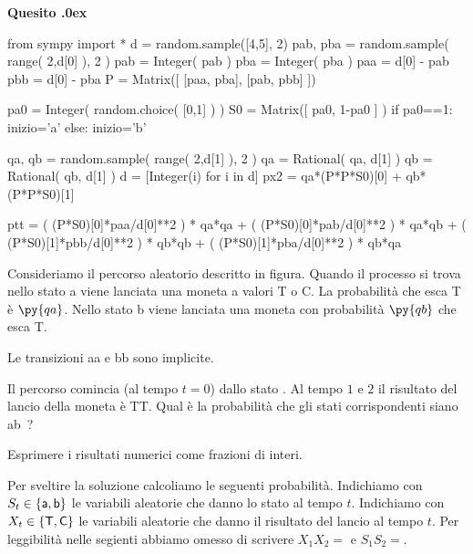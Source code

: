 \documentclass[11pt,twoside,a4paper]{article}
\newcounter{quesito}
\newenvironment{question}{\bigskip\addtocounter{quesito}{1}\bigskip\bigskip\par\textbf{Quesito \thequesito.\kern0ex}}{\par\vspace{\parskip}}
\begin{document}
\clearpage
\begin{question}%
\def\Pr{{\rm Pr\,}}
\def\nicefrac#1#2{#1/#2}
\def\pyl#1{\py{latex(#1)}}
\everymath{\displaystyle}
\renewcommand{\arraystretch}{1.5}
\begin{pycode}
from sympy import *
d =  random.sample([4,5], 2) 
pab, pba = random.sample( range( 2,d[0] ), 2 )
pab = Integer( pab )
pba = Integer( pba )
paa = d[0] - pab
pbb = d[0] - pba
P  = Matrix([ [paa, pba], 
              [pab, pbb] ])

pa0 = Integer( random.choice( [0,1] ) ) 
S0  = Matrix([ pa0, 1-pa0 ] ) 
if pa0==1: inizio='a' 
else: inizio='b' 

qa, qb = random.sample( range( 2,d[1] ), 2 ) 
qa = Rational( qa, d[1] ) 
qb = Rational( qb, d[1] ) 
d = [Integer(i) for i in d]
px2 = qa*(P*P*S0)[0] + qb*(P*P*S0)[1]

ptt = ( (P*S0)[0]*paa/d[0]**2 ) * qa*qa
+ ( (P*S0)[0]*pab/d[0]**2 ) * qa*qb
+ ( (P*S0)[1]*pbb/d[0]**2 ) * qb*qb
+ ( (P*S0)[1]*pba/d[0]**2 ) * qb*qa
\end{pycode}
Consideriamo il percorso aleatorio descritto in figura. Quando il processo si trova nello stato {\sf a} viene lanciata una moneta a valori {\sf T} o {\sf C}. La probabilità che esca {\sf T} è $\py{qa}$. Nello stato {\sf b} viene lanciata una moneta con probabilità $\py{qb}$ che esca {\sf T}.

\hfil
{}
\hfil Le transizioni {\sf aa} e {\sf bb} sono implicite.

Il percorso comincia (al tempo $t{=}0$) dallo stato {\sf {}}. Al tempo $1$ e $2$ il risultato del lancio della moneta è {\sf TT}. Qual è la probabilità che gli stati corrispondenti siano {\sf ab}~?

Esprimere i risultati numerici come frazioni di interi.

Per sveltire la soluzione calcoliamo le seguenti probabilità. Indichiamo con $S_t\in\{{\sf a}, {\sf b}\}$ le variabili aleatorie che danno lo stato al tempo $t$. Indichiamo con $X_t\in\{{\sf T}, {\sf C}\}$ le variabili aleatorie che danno il risultato del lancio al tempo $t$. Per leggibilità nelle segienti abbiamo omesso di scrivere $X_1X_2=$ e $S_1S_2=$.


\end{question}
\end{document}
